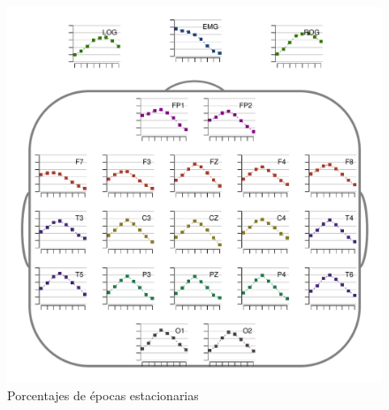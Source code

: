 \begin{figure}
\centering
\includegraphics[width=.9\linewidth]{./img_resultados/EMNNS_cabeza_epocas_.pdf}
\caption{Porcentajes de épocas estacionarias}
\end{figure}


